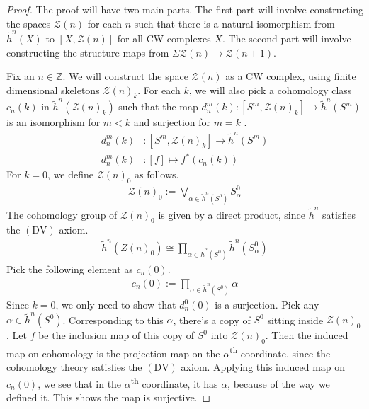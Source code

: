 \documentclass[12pt, notitlepage]{article}
\theoremstyle{definition}
\newcommand{\calz}{\mathcal{Z}}
\newcommand{\redco}{\widetilde{h}}
\newcommand{\dv}{\mathrm{DV}}
\begin{document}
\begin{proof}
  The proof will have two main parts. The first part will involve constructing the spaces $\calz(n)$
  for each $n$ such that there is a natural isomorphism from $\redco^n(X)$ to
  $\left[ X, \calz(n) \right]$ for all CW complexes $X$. The second part will involve constructing
  the structure maps from $\Sigma \calz(n) \to \calz(n+1)$.

  Fix an $n \in \mathbb{Z}$. We will construct the space $\calz(n)$ as a CW complex, using finite
  dimensional skeletons $\calz(n)_k$. For each $k$, we will also pick a cohomology class $c_n(k)$ in
  $\redco^n(\calz(n)_k)$ such that the map
  $d_n^{m}(k): \left[S^m, \calz(n)_k \right] \to \redco^n(S^m)$ is an isomorphism for $m < k$ and
  surjection for $m=k$ .
  \begin{align*}
    d_n^{m}(k) &: \left[ S^m, \calz(n)_k\right] \to \redco^n(S^m) \\
    d_n^{m}(k) &: [f] \mapsto f^{\ast}(c_n(k))
  \end{align*}
  For $k=0$, we define $\calz(n)_0$ as follows.
  \begin{align*}
    \calz(n)_0 := \bigvee_{\alpha \in \redco^n(S^0)} S_{\alpha}^0
  \end{align*}
  The cohomology group of $\calz(n)_0$ is given by a direct product, since $\redco^n$ satisfies the
  $\mathrm{(DV)}$ axiom.
  \begin{align*}
    \redco^n(Z(n)_0) \cong \prod_{\alpha \in \redco^n(S^0)} \redco^n(S_{\alpha}^0)
  \end{align*}
  Pick the following element as $c_n(0)$.
  \begin{align*}
    c_n(0) := \prod_{\alpha \in \redco^n(S^0)} \alpha
  \end{align*}
  Since $k=0$, we only need to show that $d_n^0(0)$ is a surjection. Pick any
  $\alpha \in \redco^n(S^0)$.  Corresponding to this $\alpha$, there's a copy of $S^0$ sitting
  inside $\calz(n)_0$. Let $f$ be the inclusion map of this copy of $S^0$ into $\calz(n)_0$. Then
  the induced map on cohomology is the projection map on the $\alpha$\textsuperscript{th}
  coordinate, since the cohomology theory satisfies the $(\dv)$ axiom. Applying this induced map on
  $c_n(0)$, we see that in the $\alpha$\textsuperscript{th} coordinate, it has $\alpha$, because of
  the way we defined it.  This shows the map is surjective.


\end{proof}
\end{document}
